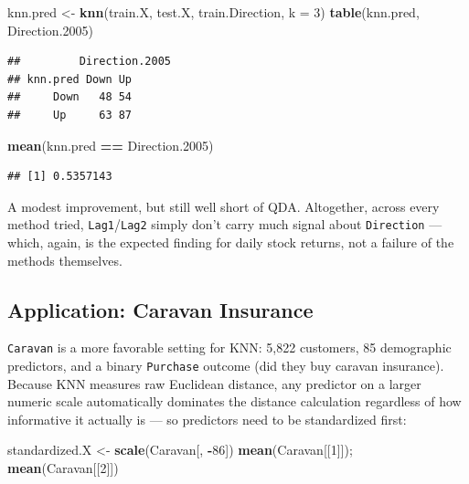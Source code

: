 \documentclass[
  11pt,
]{article}
\newenvironment{Shaded}{\begin{snugshade}}{\end{snugshade}}
\newcommand{\AttributeTok}[1]{\textcolor[rgb]{0.13,0.29,0.53}{#1}}
\newcommand{\DecValTok}[1]{\textcolor[rgb]{0.00,0.00,0.81}{#1}}
\newcommand{\FloatTok}[1]{\textcolor[rgb]{0.00,0.00,0.81}{#1}}
\newcommand{\FunctionTok}[1]{\textcolor[rgb]{0.13,0.29,0.53}{\textbf{#1}}}
\newcommand{\NormalTok}[1]{#1}
\newcommand{\OtherTok}[1]{\textcolor[rgb]{0.56,0.35,0.01}{#1}}
\newcommand{\SpecialCharTok}[1]{\textcolor[rgb]{0.81,0.36,0.00}{\textbf{#1}}}
\begin{document}
\begin{Shaded}
\begin{Highlighting}[]
\NormalTok{knn.pred }\OtherTok{\textless{}{-}} \FunctionTok{knn}\NormalTok{(train.X, test.X, train.Direction, }\AttributeTok{k =} \DecValTok{3}\NormalTok{)}
\FunctionTok{table}\NormalTok{(knn.pred, Direction}\FloatTok{.2005}\NormalTok{)}
\end{Highlighting}
\end{Shaded}

\begin{verbatim}
##         Direction.2005
## knn.pred Down Up
##     Down   48 54
##     Up     63 87
\end{verbatim}

\begin{Shaded}
\begin{Highlighting}[]
\FunctionTok{mean}\NormalTok{(knn.pred }\SpecialCharTok{==}\NormalTok{ Direction}\FloatTok{.2005}\NormalTok{)}
\end{Highlighting}
\end{Shaded}

\begin{verbatim}
## [1] 0.5357143
\end{verbatim}

A modest improvement, but still well short of QDA. Altogether, across
every method tried, \texttt{Lag1}/\texttt{Lag2} simply don't carry much
signal about \texttt{Direction} --- which, again, is the expected
finding for daily stock returns, not a failure of the methods
themselves.

\subsection{Application: Caravan
Insurance}\label{application-caravan-insurance}

\texttt{Caravan} is a more favorable setting for KNN: 5,822 customers,
85 demographic predictors, and a binary \texttt{Purchase} outcome (did
they buy caravan insurance). Because KNN measures raw Euclidean
distance, any predictor on a larger numeric scale automatically
dominates the distance calculation regardless of how informative it
actually is --- so predictors need to be standardized first:

\begin{Shaded}
\begin{Highlighting}[]
\NormalTok{standardized.X }\OtherTok{\textless{}{-}} \FunctionTok{scale}\NormalTok{(Caravan[, }\SpecialCharTok{{-}}\DecValTok{86}\NormalTok{])}
\FunctionTok{mean}\NormalTok{(Caravan[[}\DecValTok{1}\NormalTok{]]); }\FunctionTok{mean}\NormalTok{(Caravan[[}\DecValTok{2}\NormalTok{]])}
\end{Highlighting}
\end{Shaded}
\end{document}
